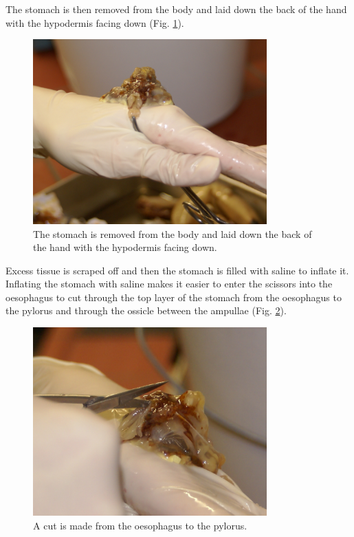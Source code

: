 The stomach is then removed from the body and laid down the back of the hand with the hypodermis facing down (Fig. \ref{fig:dissection_crab12}). 
\begin{figure}[H]
	\begin{center}
		\includegraphics[width=9cm]{graphics/dissection_crab12.png}
		\caption{The stomach is removed from the body and laid down the back of the hand with the hypodermis facing down.}
		\label{fig:dissection_crab12}
	\end{center}
\end{figure}
Excess tissue is scraped off and then the stomach is filled with saline to inflate it. Inflating the stomach with saline makes it easier to enter the scissors into the oesophagus to cut through the top layer of the stomach from the oesophagus to the pylorus and through the ossicle between the ampullae (Fig. \ref{fig:dissection_crab13}). 
\begin{figure}[H]
	\begin{center}
		\includegraphics[width=9cm]{graphics/dissection_crab13.png}
		\caption{A cut is made from the oesophagus to the pylorus.}
		\label{fig:dissection_crab13}
	\end{center}
\end{figure}
